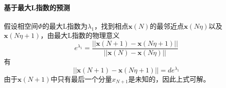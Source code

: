             \paragraph{基于最大L指数的预测}
            假设相空间$\Phi$的最大L指数为$\lambda_1 $，找到相点$\mathbf{x}(N)$的最邻近点$\mathbf{x}(N\eta)$以及$\mathbf{x}(N\eta + 1)$，由最大L指数的物理意义
            \[
                e^{\lambda_1} = \frac{||\mathbf{x}(N+1) - \mathbf{x}(N\eta +1)||}{||\mathbf{x}(N) - \mathbf{x}(N\eta)||}
            \]
            有
            \[
                ||\mathbf{x}(N+1) - \mathbf{x}(N\eta +1)|| = d e^{\lambda_1}
            \]
            由于$\mathbf{x}(N+1)$中只有最后一个分量$x_{N+1}$是未知的，因此上式可解。


